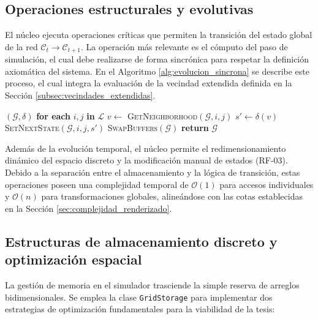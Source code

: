 \subsection{Operaciones estructurales y evolutivas}

El núcleo ejecuta operaciones críticas que permiten la transición del estado global de la red $\mathcal{C}_t \to \mathcal{C}_{t+1}$. La operación más relevante es el cómputo del paso de simulación, el cual debe realizarse de forma sincrónica para respetar la definición axiomática del sistema. En el Algoritmo \ref{alg:evolucion_sincrona} se describe este proceso, el cual integra la evaluación de la vecindad extendida definida en la Sección \ref{subsec:vecindades_extendidas}.

\begin{algorithm}[H]
\caption{Cómputo de la transición sincrónica de la red.}\label{alg:evolucion_sincrona}
\begin{algorithmic}
\STATE 
{}$(\mathcal{G}, \delta)$
\STATE \hspace{0.5cm}\textbf{for each} $i, j$ \textbf{ in } $\mathcal{L}$
\STATE \hspace{1.0cm}$v \gets$ \textsc{GetNeighborhood}$(\mathcal{G}, i, j)$
\STATE \hspace{1.0cm}$s' \gets \delta(v)$
\STATE \hspace{1.0cm}\textsc{SetNextState}$(\mathcal{G}, i, j, s')$
\STATE \hspace{0.5cm}\textsc{SwapBuffers}$(\mathcal{G})$
\STATE \textbf{return} $\mathcal{G}$
\end{algorithmic}
\end{algorithm}

Además de la evolución temporal, el núcleo permite el redimensionamiento dinámico del espacio discreto y la modificación manual de estados (RF-03). Debido a la separación entre el almacenamiento y la lógica de transición, estas operaciones poseen una complejidad temporal de $\mathcal{O}(1)$ para accesos individuales y $\mathcal{O}(n)$ para transformaciones globales, alineándose con las cotas establecidas en la Sección \ref{sec:complejidad_renderizado}.

\subsection{Estructuras de almacenamiento discreto y optimización espacial}

La gestión de memoria en el simulador trasciende la simple reserva de arreglos bidimensionales. Se emplea la clase \texttt{GridStorage} para implementar dos estrategias de optimización fundamentales para la viabilidad de la tesis:

